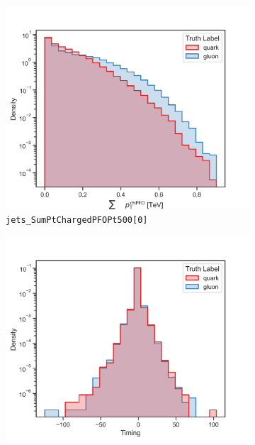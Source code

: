\begin{figure}[!htb]
	\centering
	\begin{subfigure}[t]{0.49\textwidth}
		\includegraphics[width=1\textwidth]{src/plots/distributions/highlevel/jets_SumPtChargedPFOPt500[0].png}
		\caption{\texttt{jets\_SumPtChargedPFOPt500[0]}}
		\label{fig:highlevel_18}
	\end{subfigure}
	\begin{subfigure}[t]{0.49\textwidth}
		\includegraphics[width=1\textwidth]{src/plots/distributions/highlevel/jets_Timing.png}

\end{subfigure}
\end{figure}
